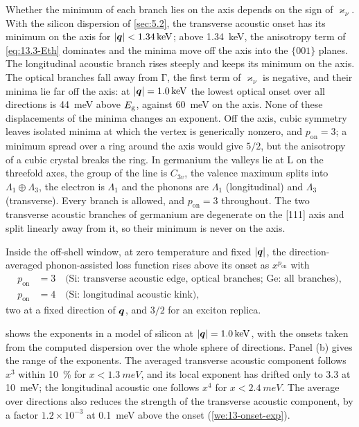 Whether the minimum of each branch lies on the axis depends on the sign of $\varkappa_\nu$. With the silicon dispersion of \cref{sec:5.2}, the transverse acoustic onset has its minimum on the axis for $|\bm{q}| < \SI{1.34}{keV}$; above \SI{1.34}{keV}, the anisotropy term of \cref{eq:13.3-Eth} dominates and the minima move off the axis into the $\{001\}$ planes. The longitudinal acoustic branch rises steeply and keeps its minimum on the axis. The optical branches fall away from $\mathrm{\Gamma}$, the first term of $\varkappa_\nu$ is negative, and their minima lie far off the axis: at $|\bm{q}| = \SI{1.0}{keV}$ the lowest optical onset over all directions is \SI{44}{meV} above $E_{\mathrm{g}}$, against \SI{60}{meV} on the axis. None of these displacements of the minima changes an exponent. Off the axis, cubic symmetry leaves isolated minima at which the vertex is generically nonzero, and $p_{\mathrm{on}} = 3$; a minimum spread over a ring around the axis would give $5/2$, but the anisotropy of a cubic crystal breaks the ring. In germanium the valleys lie at L on the threefold axes, the group of the line is $C_{3v}$, the valence maximum splits into $\Lambda_1 \oplus \Lambda_3$, the electron is $\Lambda_1$ and the phonons are $\Lambda_1$ (longitudinal) and $\Lambda_3$ (transverse). Every branch is allowed, and $p_{\mathrm{on}} = 3$ throughout. The two transverse acoustic branches of germanium are degenerate on the [111] axis and split linearly away from it, so their minimum is never on the axis.

\begin{keyresult}
Inside the off-shell window, at zero temperature and fixed $|\bm{q}|$, the direction-averaged phonon-assisted loss function rises above its onset as $x^{p_{\mathrm{on}}}$ with
\begin{equation}
  \begin{aligned}
  p_{\mathrm{on}} &= 3 \quad \text{(Si: transverse acoustic edge, optical branches; Ge: all branches)}, \\
  p_{\mathrm{on}} &= 4 \quad \text{(Si: longitudinal acoustic kink)},
  \end{aligned}
  \label{eq:13.3-pon}
\end{equation}
two at a fixed direction of $\bm{q}$, and $3/2$ for an exciton replica.
\end{keyresult}

 shows the exponents in a model of silicon at $|\bm{q}| = \SI{1.0}{keV}$, with the onsets taken from the computed dispersion over the whole sphere of directions. Panel (b) gives the range of the exponents. The averaged transverse acoustic component follows $x^3$ within \SI{10}{\percent} for $x < \SI{1.3}{meV}$, and its local exponent has drifted only to 3.3 at \SI{10}{meV}; the longitudinal acoustic one follows $x^4$ for $x < \SI{2.4}{meV}$. The average over directions also reduces the strength of the transverse acoustic component, by a factor $1.2\times10^{-3}$ at \SI{0.1}{meV} above the onset (\cref{we:13-onset-exp}).

